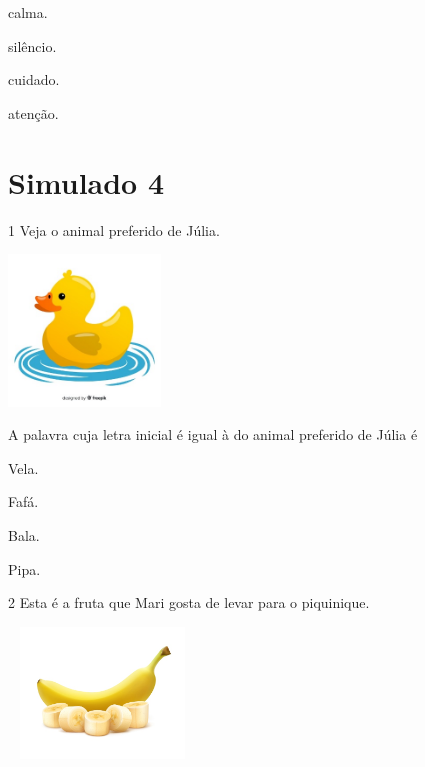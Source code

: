 \begin{escolha}
\item calma.

\item silêncio.

\item cuidado.

\item atenção.
\end{escolha}


\chapter{Simulado 4}

\num{1} Veja o animal preferido de Júlia.

\includegraphics[width=1.58974in,height=1.58974in]{media/image174.jpeg}


A palavra cuja letra inicial é igual à do animal preferido de Júlia é

\begin{escolha}
\item Vela.

\item Fafá.

\item Bala.

\item Pipa.
\end{escolha}

\num{2} Esta é a fruta que Mari gosta de levar para o piquinique.

\includegraphics[width=1.96704in,height=1.37153in]{media/image175.jpeg}

